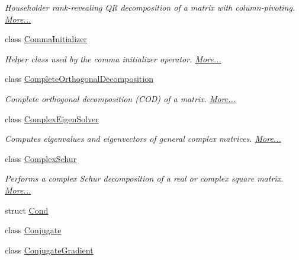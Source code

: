 \begin{DoxyCompactItemize}
\begin{DoxyCompactList}\small\item\em Householder rank-\/revealing QR decomposition of a matrix with column-\/pivoting.  \hyperlink{group___q_r___module_class_eigen_1_1_col_piv_householder_q_r}{More...}\end{DoxyCompactList}\item 
class \hyperlink{group___core___module_struct_eigen_1_1_comma_initializer}{Comma\+Initializer}
\begin{DoxyCompactList}\small\item\em Helper class used by the comma initializer operator.  \hyperlink{group___core___module_struct_eigen_1_1_comma_initializer}{More...}\end{DoxyCompactList}\item 
class \hyperlink{group___q_r___module_class_eigen_1_1_complete_orthogonal_decomposition}{Complete\+Orthogonal\+Decomposition}
\begin{DoxyCompactList}\small\item\em Complete orthogonal decomposition (C\+OD) of a matrix.  \hyperlink{group___q_r___module_class_eigen_1_1_complete_orthogonal_decomposition}{More...}\end{DoxyCompactList}\item 
class \hyperlink{group___eigenvalues___module_class_eigen_1_1_complex_eigen_solver}{Complex\+Eigen\+Solver}
\begin{DoxyCompactList}\small\item\em Computes eigenvalues and eigenvectors of general complex matrices.  \hyperlink{group___eigenvalues___module_class_eigen_1_1_complex_eigen_solver}{More...}\end{DoxyCompactList}\item 
class \hyperlink{group___eigenvalues___module_class_eigen_1_1_complex_schur}{Complex\+Schur}
\begin{DoxyCompactList}\small\item\em Performs a complex Schur decomposition of a real or complex square matrix.  \hyperlink{group___eigenvalues___module_class_eigen_1_1_complex_schur}{More...}\end{DoxyCompactList}\item 
struct \hyperlink{struct_eigen_1_1_cond}{Cond}
\item 
class \hyperlink{class_eigen_1_1_conjugate}{Conjugate}
\item 
class \hyperlink{group___iterative_linear_solvers___module_class_eigen_1_1_conjugate_gradient}{Conjugate\+Gradient}

\end{DoxyCompactItemize}

